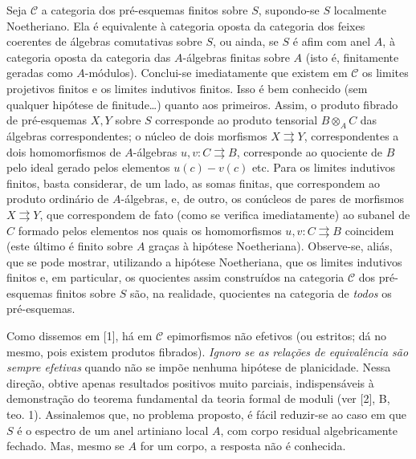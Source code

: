 \documentclass[11pt,twoside,openany]{book}
\numberwithin{equation}{section}
\newcommand{\src}[1]{%
  \phantomsection\hypertarget{src:#1}{}%
  \marginpar{\raggedleft\footnotesize\sffamily #1}%
}
\theoremstyle{plain}
\theoremstyle{definition}
\theoremstyle{remark}
\newcommand{\FgaUnitKey}{frontmatter}
\renewcommand{\src}[1]{%
  \phantomsection\hypertarget{src:\FgaUnitKey:#1}{}%
  \marginpar{\raggedleft\footnotesize\sffamily #1}%
}
\begin{document}
Seja $\mathcal C$ a categoria dos pré-esquemas finitos sobre $S$, supondo-se
$S$ localmente Noetheriano. Ela é equivalente à categoria oposta da categoria
dos feixes coerentes de álgebras comutativas sobre $S$, ou ainda, se $S$ é
afim com anel $A$, à categoria oposta da categoria das $A$-álgebras finitas
sobre $A$ (isto é, finitamente geradas como $A$-módulos). Conclui-se
imediatamente que existem em $\mathcal C$ os limites projetivos finitos e os
limites indutivos finitos. Isso é bem conhecido (sem qualquer hipótese de
finitude\ldots) quanto aos primeiros. Assim, o produto fibrado de pré-esquemas
$X,Y$ sobre $S$ corresponde ao produto tensorial $B\otimes_A C$ das álgebras
correspondentes; o núcleo de dois morfismos $X\rightrightarrows Y$,
correspondentes a dois homomorfismos de $A$-álgebras
$u,v:C\rightrightarrows B$, corresponde ao quociente de $B$ pelo ideal gerado
pelos elementos $u(c)-v(c)$ etc. Para os limites indutivos finitos, basta
considerar, de um lado, as somas finitas, que correspondem ao produto ordinário
de $A$-álgebras, e, de outro, os conúcleos de pares de morfismos
$X\rightrightarrows Y$, que correspondem de fato (como se verifica
imediatamente) ao subanel de $C$ formado pelos elementos nos quais os
homomorfismos $u,v:C\rightrightarrows B$ coincidem (este último é finito sobre
$A$ graças à hipótese Noetheriana). Observe-se, aliás, que se pode mostrar,
utilizando a hipótese Noetheriana, que os limites indutivos finitos e, em
particular, os quocientes assim construídos na categoria $\mathcal C$ dos
pré-esquemas finitos sobre $S$ são, na realidade, quocientes na categoria de
\emph{todos} os pré-esquemas.
\src{103}
Como dissemos em [1], há em $\mathcal C$ epimorfismos não efetivos (ou
estritos;
dá no mesmo, pois existem produtos fibrados). \emph{Ignoro se as relações de
equivalência são sempre efetivas} quando não se impõe nenhuma hipótese de
planicidade. Nessa direção, obtive apenas resultados positivos muito parciais,
indispensáveis à demonstração do teorema fundamental da teoria formal de
moduli (ver [2], B, teo. 1). Assinalemos que, no problema proposto, é fácil
reduzir-se ao caso em que $S$ é o espectro de um anel artiniano local $A$, com
corpo residual algebricamente fechado. Mas, mesmo se $A$ for um corpo, a
resposta não é conhecida.
\end{document}

